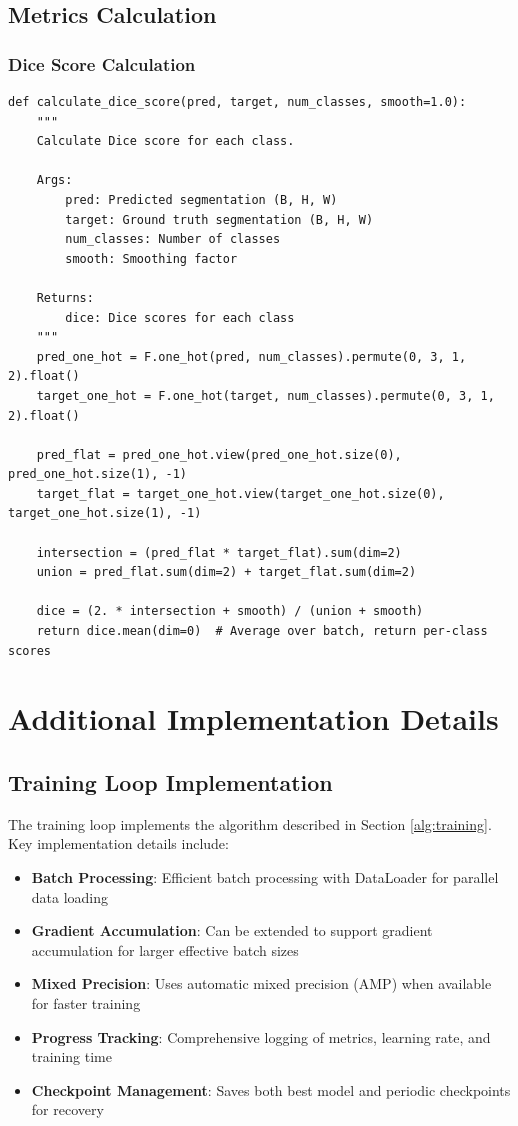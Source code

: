 \documentclass[12pt,a4paper]{article}
\begin{document}
\subsection{Metrics Calculation}

\subsubsection{Dice Score Calculation}
\begin{lstlisting}
def calculate_dice_score(pred, target, num_classes, smooth=1.0):
    """
    Calculate Dice score for each class.
    
    Args:
        pred: Predicted segmentation (B, H, W)
        target: Ground truth segmentation (B, H, W)
        num_classes: Number of classes
        smooth: Smoothing factor
    
    Returns:
        dice: Dice scores for each class
    """
    pred_one_hot = F.one_hot(pred, num_classes).permute(0, 3, 1, 2).float()
    target_one_hot = F.one_hot(target, num_classes).permute(0, 3, 1, 2).float()
    
    pred_flat = pred_one_hot.view(pred_one_hot.size(0), pred_one_hot.size(1), -1)
    target_flat = target_one_hot.view(target_one_hot.size(0), target_one_hot.size(1), -1)
    
    intersection = (pred_flat * target_flat).sum(dim=2)
    union = pred_flat.sum(dim=2) + target_flat.sum(dim=2)
    
    dice = (2. * intersection + smooth) / (union + smooth)
    return dice.mean(dim=0)  # Average over batch, return per-class scores
\end{lstlisting}

\section{Additional Implementation Details}

\subsection{Training Loop Implementation}

The training loop implements the algorithm described in Section \ref{alg:training}. Key implementation details include:

\begin{itemize}
    \item \textbf{Batch Processing}: Efficient batch processing with DataLoader for parallel data loading
    \item \textbf{Gradient Accumulation}: Can be extended to support gradient accumulation for larger effective batch sizes
    \item \textbf{Mixed Precision}: Uses automatic mixed precision (AMP) when available for faster training
    \item \textbf{Progress Tracking}: Comprehensive logging of metrics, learning rate, and training time
    \item \textbf{Checkpoint Management}: Saves both best model and periodic checkpoints for recovery
\end{itemize}
\end{document}
